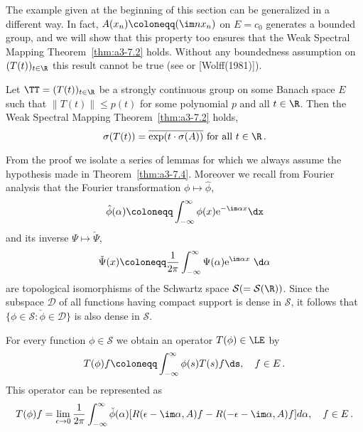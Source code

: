 The example given at the beginning of this section can be generalized in a different way.
In fact, $A(x_{n}) \coloneqq (\im nx_{n})$ on $E = c_{0}$ generates a bounded group, and we will show that this property too ensures that the Weak Spectral Mapping Theorem~\ref{thm:a3-7.2} holds.
Without any boundedness assumption on $(T(t))_{t\in\R}$ this result cannot be true (see \citet[Sec.23.16]{hillephillips:1957} or [Wolff(1981)]).
\begin{theorem}\label{thm:a3-7.4}
Let $\TT = (T(t))_{t\in\R}$ be a strongly continuous group on some Banach space $E$ such that $\|T(t)\| \leq p(t)$ for some polynomial $p$ and all $t \in \R$.
Then the Weak Spectral Mapping Theorem~\ref{thm:a3-7.2} holds, \ie 
\[
\sigma(T(t)) = \overline{\exp(t\cdot\sigma(A))} \text{ for all } t \in \R\,.
\]
\end{theorem}
From the proof we isolate a series of lemmas for which we always assume the hypothesis made in Theorem~\ref{thm:a3-7.4}.
Moreover we recall from Fourier analysis that the Fourier transformation $\phi \mapsto \hat{\phi}$,
\[
\hat{\phi}(\alpha) \coloneqq \int_{-\infty}^{\infty} \phi(x)\mathrm{e}^{-\im\alpha x} \dx
\]
and its inverse $\Psi \mapsto \check{\Psi}$,
\[
\check{\Psi}(x) \coloneqq \frac{1}{2\pi}\int_{-\infty}^{\infty} \Psi(\alpha)\mathrm{e}^{\im\alpha x} \ \d \alpha
\]
are topological isomorphisms of the Schwartz space $\mathcal{S} ( = \mathcal{S}(\R))$.
Since the subspace $\mathcal{D}$ of all functions having compact support is dense in $\mathcal{S}$, it follows that $\{\phi \in \mathcal{S} \colon \check{\phi} \in \mathcal{D}\}$ is also dense in $\mathcal{S}$.
\begin{lemma}\label{lem:a3-7.5}
For every function $\phi \in \mathcal{S}$ we obtain an operator $T(\phi) \in \LE$ by
\[
T(\phi)f \coloneqq \int_{-\infty}^{\infty} \phi(s)T(s)f \ds, \quad f \in E\,.
\]
This operator can be represented as
\begin{equation}\label{eq:a3-7.4}
T(\phi)f = \lim_{\epsilon\to 0} \frac{1}{2\pi}\int_{-\infty}^{\infty} \check{\phi}(\alpha)[R(\epsilon-\im\alpha,A)f - R(-\epsilon-\im\alpha,A)f] d\alpha, \quad f \in E\,.
\end{equation}
\end{lemma}

